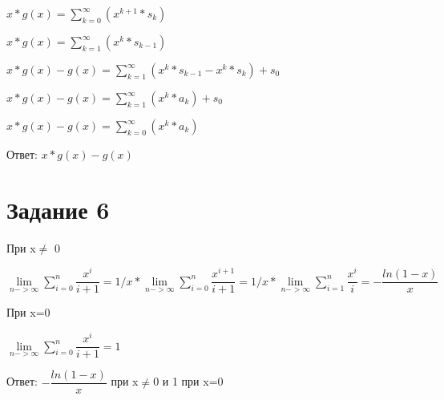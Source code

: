 \documentclass[a4paper, 12pt]{article}
\begin{document}
		$x*g(x)=\sum\limits_{k=0}^{\infty}(x^{k+1}*s_k)$

		$x*g(x)=\sum\limits_{k=1}^{\infty}(x^{k}*s_{k-1})$

		$x*g(x)-g(x)=\sum\limits_{k=1}^{\infty}(x^k*s_{k-1}-x^k*s_k)+s_0$

		$x*g(x)-g(x)=\sum\limits_{k=1}^{\infty}(x^k*a_{k})+s_0$

		$x*g(x)-g(x)=\sum\limits_{k=0}^{\infty}(x^k*a_{k})$

		Ответ: $x*g(x)-g(x)$
	\section*{Задание 6}
		При x$\neq$ 0

		$\lim\limits_{n->\infty}\sum\limits_{i=0}^{n}\dfrac{x^i}{i+1}=1/x*\lim\limits_{n->\infty}\sum\limits_{i=0}^{n}\dfrac{x^{i+1}}{i+1}=1/x*\lim\limits_{n->\infty}\sum\limits_{i=1}^{n}\dfrac{x^i}{i}=-\dfrac{ln(1-x)}{x}$

		При x=0

		$\lim\limits_{n->\infty}\sum\limits_{i=0}^{n}\dfrac{x^i}{i+1}=1$

		Ответ: $-\dfrac{ln(1-x)}{x}$ при x$\neq$0 и 1 при x=0
\end{document}
